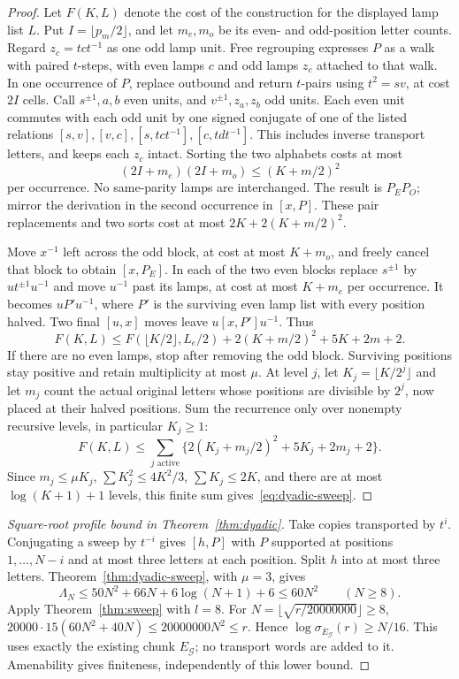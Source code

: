 \begin{proof}
Let $F(K,L)$ denote the cost of the construction for the displayed lamp list $L$. Put $I=\lfloor p_m/2\rfloor$,
and let $m_e,m_o$ be its even- and odd-position letter counts. Regard $z_c=tct^{-1}$ as one odd lamp unit.
Free regrouping expresses $P$ as a walk with paired $t$-steps, with even lamps $c$ and odd lamps $z_c$ attached to that walk.
In one occurrence of $P$, replace outbound and return $t$-pairs using $t^2=sv$, at cost $2I$ cells.
Call $s^{\pm1},a,b$ even units, and $v^{\pm1},z_a,z_b$ odd units. Each even unit commutes with each odd unit by one signed
conjugate of one of the listed relations $[s,v],[v,c],[s,tct^{-1}],[c,tdt^{-1}]$.
This includes inverse transport letters, and keeps each $z_c$ intact. Sorting the two alphabets costs at most
\[
 (2I+m_e)(2I+m_o)\le(K+m/2)^2
\]
per occurrence. No same-parity lamps are interchanged. The result is $P_EP_O$; mirror the derivation in the second occurrence in
$[x,P]$. These pair replacements and two sorts cost at most $2K+2(K+m/2)^2$.

Move $x^{-1}$ left across the odd block, at cost at most $K+m_o$, and freely cancel that block to obtain $[x,P_E]$.
In each of the two even blocks replace $s^{\pm1}$ by $ut^{\pm1}u^{-1}$ and move $u^{-1}$ past its lamps, at cost at most $K+m_e$
per occurrence. It becomes $uP'u^{-1}$, where $P'$ is the surviving even lamp list with every position halved.
Two final $[u,x]$ moves leave $u[x,P']u^{-1}$. Thus
\[
 F(K,L)\le F(\lfloor K/2\rfloor,L_e/2)
       +2(K+m/2)^2+5K+2m+2.
\]
If there are no even lamps, stop after removing the odd block. Surviving positions stay positive and retain multiplicity at most $\mu$.
At level $j$, let $K_j=\lfloor K/2^j\rfloor$ and let $m_j$ count the actual original letters whose positions are divisible by $2^j$,
now placed at their halved positions. Sum the recurrence only over nonempty recursive levels, in particular $K_j\ge1$:
\[
 F(K,L)\le\sum_{j\text{ active}}
 \{2(K_j+m_j/2)^2+5K_j+2m_j+2\}.
\]
Since $m_j\le\mu K_j$, $\sum K_j^2\le4K^2/3$, $\sum K_j\le2K$, and there are at most $\log(K+1)+1$ levels,
this finite sum gives~\eqref{eq:dyadic-sweep}.
\end{proof}

\begin{proof}[Square-root profile bound in Theorem~\ref{thm:dyadic}]
Take copies transported by $t^i$. Conjugating a sweep by $t^{-i}$ gives $[h,P]$ with $P$ supported at positions $1,\ldots,N-i$
and at most three letters at each position. Split $h$ into at most three letters. Theorem~\ref{thm:dyadic-sweep}, with $\mu=3$, gives
\[
 \Lambda_N\le50N^2+66N+6\log(N+1)+6\le60N^2\qquad(N\ge8).
\]
Apply Theorem~\ref{thm:sweep} with $l=8$. For $N=\lfloor\sqrt{r/20000000}\rfloor\ge8$,
$20000\cdot15(60N^2+40N)\le20000000N^2\le r$.
Hence $\log\sigma_{E_{\mathcal G}}(r)\ge N/16$. This uses exactly the existing chunk $E_{\mathcal G}$;
no transport words are added to it. Amenability gives finiteness, independently of this lower bound.
\end{proof}

